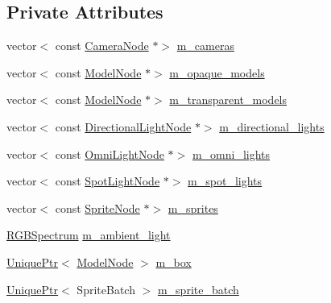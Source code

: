 \subsection*{Private Attributes}
\begin{DoxyCompactItemize}
\item 
vector$<$ const \hyperlink{classmage_1_1_camera_node}{Camera\+Node} $\ast$$>$ \hyperlink{classmage_1_1_scene_renderer_ab5cbca432beba0024d5c331ebe94743d}{m\+\_\+cameras}
\item 
vector$<$ const \hyperlink{classmage_1_1_model_node}{Model\+Node} $\ast$$>$ \hyperlink{classmage_1_1_scene_renderer_a9a863c542b4a6e4467b244fb7632fefd}{m\+\_\+opaque\+\_\+models}
\item 
vector$<$ const \hyperlink{classmage_1_1_model_node}{Model\+Node} $\ast$$>$ \hyperlink{classmage_1_1_scene_renderer_abc7a7370f5d824c74449266f170b9d8c}{m\+\_\+transparent\+\_\+models}
\item 
vector$<$ const \hyperlink{namespacemage_a7637b5351fc0f66a10badd80ebb35899}{Directional\+Light\+Node} $\ast$$>$ \hyperlink{classmage_1_1_scene_renderer_a54f958f2edce821fa41913fb900affe7}{m\+\_\+directional\+\_\+lights}
\item 
vector$<$ const \hyperlink{namespacemage_a1724c6e6b6b5ba535cdd967cbbb4a669}{Omni\+Light\+Node} $\ast$$>$ \hyperlink{classmage_1_1_scene_renderer_a90d14f98eeeb61eec43ab45c6c69f317}{m\+\_\+omni\+\_\+lights}
\item 
vector$<$ const \hyperlink{namespacemage_aeed5dee4ff6c591eabb0e9114256df4a}{Spot\+Light\+Node} $\ast$$>$ \hyperlink{classmage_1_1_scene_renderer_a227753ffa4f341546b4bd7d3fc82b1eb}{m\+\_\+spot\+\_\+lights}
\item 
vector$<$ const \hyperlink{classmage_1_1_sprite_node}{Sprite\+Node} $\ast$$>$ \hyperlink{classmage_1_1_scene_renderer_a6953113e6196498460eafceab6f00f35}{m\+\_\+sprites}
\item 
\hyperlink{structmage_1_1_r_g_b_spectrum}{R\+G\+B\+Spectrum} \hyperlink{classmage_1_1_scene_renderer_a2d6568c76b91600b16b273900732006c}{m\+\_\+ambient\+\_\+light}
\item 
\hyperlink{namespacemage_a3316d7143a973e37adf1110f2e80ca31}{Unique\+Ptr}$<$ \hyperlink{classmage_1_1_model_node}{Model\+Node} $>$ \hyperlink{classmage_1_1_scene_renderer_a2083891540f5fca8a26ea8a10b7f01cc}{m\+\_\+box}
\item 
\hyperlink{namespacemage_a3316d7143a973e37adf1110f2e80ca31}{Unique\+Ptr}$<$ Sprite\+Batch $>$ \hyperlink{classmage_1_1_scene_renderer_ac0ce4e836c117307c655eb5634e88f5c}{m\+\_\+sprite\+\_\+batch}
$$
\end{DoxyCompactItemize}
